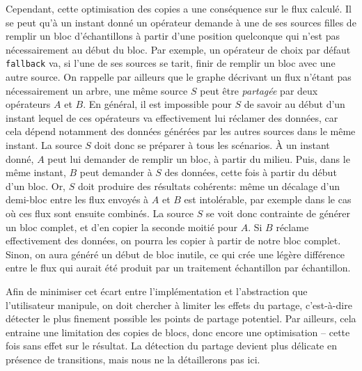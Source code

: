 \documentclass[twoside]{article}
\newcommand{\TODO}[1]{\textbf{TODO~: }{#1}}
\theoremstyle{plain}
\theoremstyle{definition}
\theoremstyle{remark}
\begin{document}
Cependant, cette optimisation des copies a une conséquence sur le flux calculé.
Il se peut qu'à un instant donné un opérateur demande à une de ses sources 
filles de remplir un bloc d'échantillons à partir d'une position quelconque
qui n'est pas nécessairement au début du bloc. Par exemple, un opérateur de choix par défaut
\verb.fallback. va, si l'une de ses sources se tarit, finir de remplir un bloc
 avec une autre source. On rappelle par ailleurs que
le graphe décrivant un flux n'étant pas nécessairement un arbre, une
même source $S$ peut être \emph{partagée} par deux opérateurs $A$ et $B$.
En général, il est impossible pour $S$ de savoir au début d'un instant
lequel de ces opérateurs va effectivement lui réclamer des données,
car cela dépend notamment des données générées par les autres sources dans le même 
instant. La source $S$ doit donc se préparer à tous les scénarios.
À un instant donné, $A$ peut lui demander de remplir un bloc, à partir du milieu.
Puis, dans le même instant,
$B$ peut demander à $S$ des données, cette fois à partir du début d'un
bloc.  Or, $S$ doit produire des résultats cohérents: même un décalage d'un
demi-bloc entre les flux envoyés à $A$ et $B$ est intolérable, par exemple dans
le cas où ces flux sont ensuite combinés. La source $S$ se voit donc contrainte de
générer un bloc complet, et d'en copier la seconde moitié pour $A$.
Si $B$ réclame effectivement des données, on pourra les copier à partir de
notre bloc complet. Sinon, on aura généré un début de bloc inutile, ce qui crée
une légère différence entre le flux qui aurait été produit par un
traitement échantillon par échantillon.

Afin de minimiser cet écart entre l'implémentation et l'abstraction que
l'utilisateur manipule, on doit chercher à limiter les effets du partage,
c'est-à-dire détecter le plus finement possible les points de partage 
potentiel.
Par ailleurs, cela entraine une limitation des copies de blocs, donc encore une
optimisation -- cette fois sans effet sur le résultat. La détection du partage
devient plus délicate en présence de transitions, mais nous ne la détaillerons
pas ici.

\end{document}
